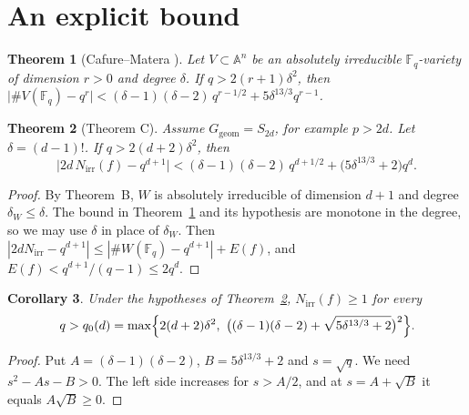 \documentclass[11pt,a4paper]{article}
\newtheorem{theorem}{Theorem}[section]
\newtheorem{corollary}[theorem]{Corollary}
\theoremstyle{definition}
\theoremstyle{remark}
\newcommand{\Fq}{\mathbb{F}_q}
\newcommand{\A}{\mathbb{A}}
\newcommand{\Ggeom}{G_{\mathrm{geom}}}
\newcommand{\Nirr}{N_{\mathrm{irr}}}
\begin{document}
\section{An explicit bound}\label{sec:explicit}

\begin{theorem}[Cafure--Matera {\cite[Thm.~7.1]{CM2006}}]\label{thm:CM}
Let $V\subset\A^n$ be an absolutely irreducible $\Fq$-variety of dimension $r>0$ and degree $\delta$.
If $q>2(r+1)\delta^2$, then
$\bigl|\#V(\Fq)-q^r\bigr|<(\delta-1)(\delta-2)\,q^{r-1/2}+5\delta^{13/3}q^{r-1}$.
\end{theorem}

\begin{theorem}[Theorem C]\label{thm:explicit}
Assume $\Ggeom=S_{2d}$, for example $p>2d$. Let $\delta=(d-1)!$. If $q>2(d+2)\delta^2$, then
\[
  \bigl|2d\,\Nirr(f)-q^{d+1}\bigr|<(\delta-1)(\delta-2)\,q^{d+1/2}+\bigl(5\delta^{13/3}+2\bigr)q^d .
\]
\end{theorem}

\begin{proof}
By Theorem~B, $W$ is absolutely irreducible of dimension $d+1$ and degree $\delta_W\le\delta$.
The bound in Theorem~\ref{thm:CM} and its hypothesis are monotone in the degree, so we may use
$\delta$ in place of $\delta_W$. Then
$|2d\Nirr-q^{d+1}|\le|\#W(\Fq)-q^{d+1}|+E(f)$, and $E(f)<q^{d+1}/(q-1)\le 2q^d$.
\end{proof}

\begin{corollary}\label{cor:threshold}
Under the hypotheses of Theorem~\ref{thm:explicit}, $\Nirr(f)\ge1$ for every
\[
 q>q_0(d)=\max\Bigl\{2(d+2)\delta^2,\ \bigl((\delta-1)(\delta-2)+\sqrt{5\delta^{13/3}+2}\bigr)^2\Bigr\}.
\]
\end{corollary}

\begin{proof}
Put $A=(\delta-1)(\delta-2)$, $B=5\delta^{13/3}+2$ and $s=\sqrt q$. We need $s^2-As-B>0$.
The left side increases for $s>A/2$, and at $s=A+\sqrt B$ it equals $A\sqrt B\ge0$.
\end{proof}

\begin{table}[ht]
\centering

\caption{Thresholds for $\Nirr\ge1$, as $\log_{10}q_0(d)$. The column ``v5'' is the value
$(8d)^{2d+6}$ claimed in v5; it was not proved. The other columns are
Proposition~\ref{prop:katz}, Corollary~\ref{cor:threshold} and Proposition~\ref{prop:sawin}.
The smallest rigorous value in each row is in bold. For $d\le3$ Theorem~D removes the threshold.
Source: \texttt{data/thresholds.csv}.}
\label{tab:thresholds}
\end{table}
\end{document}
